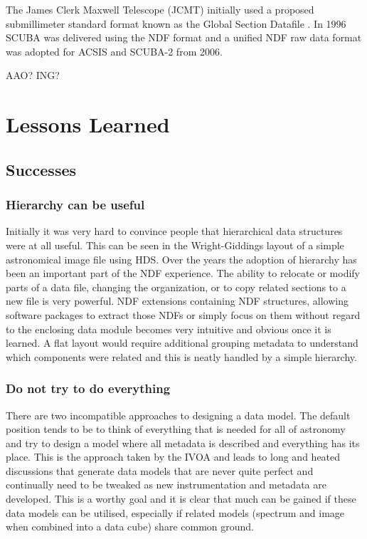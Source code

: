 \documentclass[final,authoryear,5p,times,twocolumn]{elsarticle}
\begin{document}
{The James Clerk Maxwell Telescope (JCMT) initially used a proposed
submillimeter standard format known as the Global Section Datafile
\citep[GSD;][formerly General Single Dish Data]{sun229}. In 1996 SCUBA
was delivered using the NDF format and a unified NDF raw data format
was adopted for ACSIS and SCUBA-2 from 2006.

{\color{red}AAO? ING?}

\section{Lessons Learned}

\subsection{Successes}

\subsubsection{Hierarchy can be useful}

Initially it was very hard to convince people that hierarchical data
structures were at all useful. This can be seen in the Wright-Giddings
layout of a simple astronomical image file using HDS. Over the years
the adoption of hierarchy has been an important part of the NDF
experience. The ability to relocate or modify parts of a data file,
changing the organization, or to copy related sections to a new file
is very powerful.  NDF extensions containing NDF structures, allowing
software packages to extract those NDFs or simply focus on them
without regard to the enclosing data module becomes very intuitive and
obvious once it is learned. A flat layout would require additional
grouping metadata to understand which components were related and this
is neatly handled by a simple hierarchy.

\subsubsection{Do not try to do everything}

There are two incompatible approaches to designing a data model. The
default position tends to be to think of everything that is needed for
all of astronomy and try to design a model where all metadata is
described and everything has its place. This is the approach taken by
the IVOA \citep[see e.g.][]{2012arXiv1204.3055M} and leads to long and
heated discussions that generate data models that are never quite
perfect and continually need to be tweaked as new instrumentation and
metadata are developed. This is a worthy goal and it is clear that
much can be gained if these data models can be utilised, especially if
related models (spectrum and image when combined into a data cube)
share common ground.

}
\end{document}
